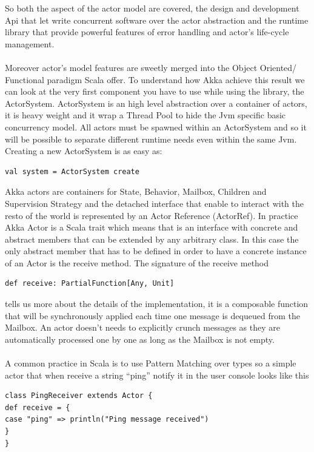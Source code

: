 \documentclass{sig-alternate}
\begin{document}
So both the aspect of the actor model are covered, the design and development Api that let write concurrent software over the actor abstraction and the runtime library that provide powerful features of error handling and actor's life-cycle management.
\\\\

Moreover actor's model features are sweetly merged into the Object Oriented/ Functional paradigm Scala offer.
To understand how Akka achieve this result we can look at the very first component you have to use while using the library, the ActorSystem.
ActorSystem is an high level abstraction over a container of actors, it is heavy weight and it wrap a Thread Pool to hide the Jvm specific basic concurrency model.
All actors must be spawned within an ActorSystem and so it will be possible to separate different runtime needs even within the same Jvm.
Creating a new ActorSystem is as easy as:
\begin{lstlisting}
val system = ActorSystem create
\end{lstlisting}

Akka actors are containers for State, Behavior, Mailbox, Children and Supervision Strategy and the detached interface that enable to interact with the resto of the world is represented by an Actor Reference (ActorRef).
In practice Akka Actor is a Scala trait which means that is an interface with concrete and abstract members that can be extended by any arbitrary class.
In this case the only abstract member that has to be defined in order to have a concrete instance of an Actor is the receive method.
The signature of the receive method 
\begin{lstlisting}
def receive: PartialFunction[Any, Unit]
\end{lstlisting}
tells us more about the details of the implementation, it is a composable function that will be synchronously applied each time one message is dequeued from the Mailbox.
An actor doesn't needs to explicitly crunch messages as they are automatically processed one by one as long as the Mailbox is not empty.
\\\\

A common practice in Scala is to use Pattern Matching over types so a simple actor that when receive a string ``ping'' notify it in the user console looks like this
\begin{lstlisting}
class PingReceiver extends Actor {
def receive = {
case "ping" => println("Ping message received")
}
}
\end{lstlisting}
\end{document}
